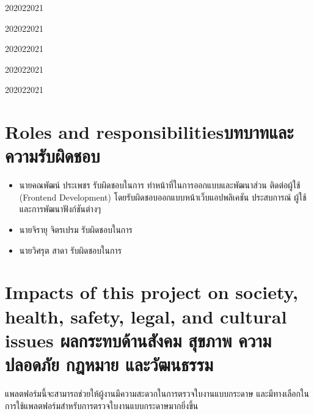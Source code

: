 \begin{plan}{6}{2020}{2}{2021}
\end{plan}

\begin{plan}{6}{2020}{2}{2021}
\end{plan}

\begin{plan}{6}{2020}{2}{2021}
\end{plan}

\begin{plan}{6}{2020}{2}{2021}
\end{plan}

\begin{plan}{6}{2020}{2}{2021}
\end{plan}

\section{\ifenglish Roles and responsibilities\else บทบาทและความรับผิดชอบ\fi}
    \begin{itemize}
        \item นายคณพัฒน์ ประเพชร รับผิดชอบในการ ทําหน้าที่ในการออกแบบและพัฒนาส่วน
ติดต่อผู้ใช้ (Frontend Development) โดยรับผิดชอบออกแบบหน้าเว็บแอปพลิเคชัน ประสบการณ์
ผู้ใช้ และการพัฒนาฟังก์ชันต่างๆ
        \item นายจิรายุ จิตรเปรม รับผิดชอบในการ
        \item นายวิศรุต สาดา รับผิดชอบในการ
    \end{itemize}

\section{\ifenglish%
Impacts of this project on society, health, safety, legal, and cultural issues
\else%
ผลกระทบด้านสังคม สุขภาพ ความปลอดภัย กฎหมาย และวัฒนธรรม
\fi}
\qquad แพลตฟอร์มนี้จะสามารถช่วยให้ผู้งานมีความสะดวกในการตรวจใบงานแบบกระดาษ และมีทางเลือกในการใช้แพลตฟอร์มสําหรับการตรวจใบงานแบบกระดาษมากยิ่งขึ้น